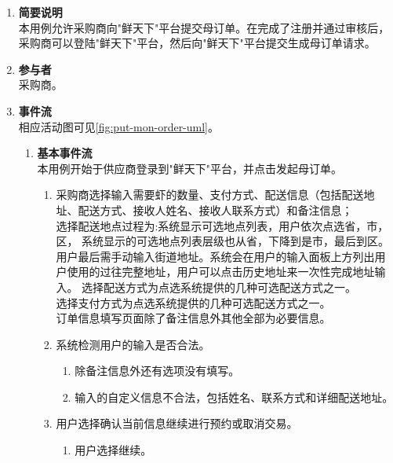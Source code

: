 \begin{enumerate}
    \item \textbf{简要说明}  \\ 本用例允许采购商向"鲜天下"平台提交母订单。在完成了注册并通过审核后，采购商可以登陆"鲜天下"平台，然后向"鲜天下"平台提交生成母订单请求。
    \item \textbf{参与者} \\ 采购商。
    \item \textbf{事件流} \\ 相应活动图可见\autoref{fig:put-mon-order-uml}。
    \begin{enumerate} 
        \item \textbf{基本事件流} \\ 本用例开始于供应商登录到"鲜天下"平台，并点击发起母订单。
        \begin{enumerate}
            \item 采购商选择输入需要虾的数量、支付方式、配送信息（包括配送地址、配送方式、接收人姓名、接收人联系方式）和备注信息；\\
            选择配送地点过程为:系统显示可选地点列表，用户依次点选省，市，区， 系统显示的可选地点列表层级也从省，下降到是市，最后到区。用户最后需手动输入街道地址。系统会在用户的输入面板上方列出用户使用的过往完整地址，用户可以点击历史地址来一次性完成地址输入。
            选择配送方式为点选系统提供的几种可选配送方式之一。\\
            选择支付方式为点选系统提供的几种可选配送方式之一。\\
        ​    订单信息填写页面除了备注信息外其他全部为必要信息。\\

            \item 系统检测用户的输入是否合法。
            \begin{enumerate}
                \item 除备注信息外还有选项没有填写。
                \item 输入的自定义信息不合法，包括姓名、联系方式和详细配送地址。
            \end{enumerate}

            \item 用户选择确认当前信息继续进行预约或取消交易。
            \begin{enumerate}
                \item 用户选择继续。
            \end{enumerate}


\end{enumerate}
\end{enumerate}
\end{enumerate}
